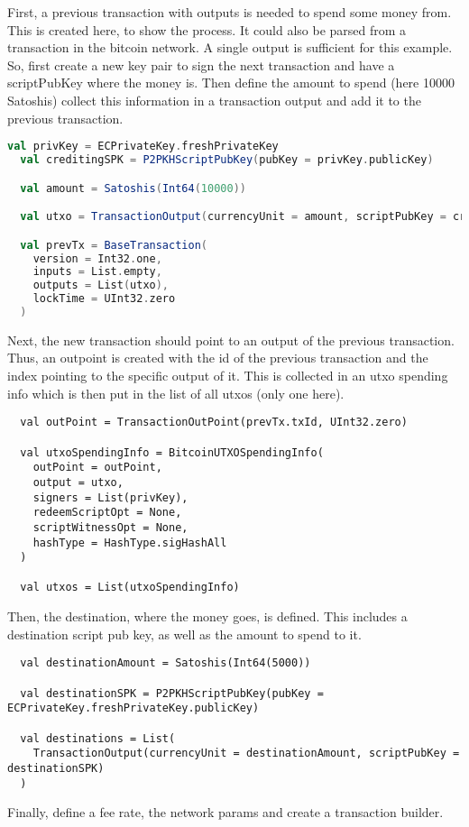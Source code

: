 First, a previous transaction with outputs is needed to spend some money from.
This is created here, to show the process.
It could also be parsed from a transaction in the bitcoin network.
A single output is sufficient for this example.
So, first create a new key pair to sign the next transaction and have a scriptPubKey where the money is.
Then define the amount to spend (here 10000 Satoshis) collect this information in a transaction output and add it to the previous transaction.
\begin{lstlisting}[language=scala]
  val privKey = ECPrivateKey.freshPrivateKey
  val creditingSPK = P2PKHScriptPubKey(pubKey = privKey.publicKey)

  val amount = Satoshis(Int64(10000))

  val utxo = TransactionOutput(currencyUnit = amount, scriptPubKey = creditingSPK)

  val prevTx = BaseTransaction(
    version = Int32.one,
    inputs = List.empty,
    outputs = List(utxo),
    lockTime = UInt32.zero
  )
\end{lstlisting}
Next, the new transaction should point to an output of the previous transaction.
Thus, an outpoint is created with the id of the previous transaction and the index pointing to the specific output of it.
This is collected in an utxo spending info which is then put in the list of all utxos (only one here).
\begin{lstlisting}  
  val outPoint = TransactionOutPoint(prevTx.txId, UInt32.zero)

  val utxoSpendingInfo = BitcoinUTXOSpendingInfo(
    outPoint = outPoint,
    output = utxo,
    signers = List(privKey),
    redeemScriptOpt = None,
    scriptWitnessOpt = None,
    hashType = HashType.sigHashAll
  )

  val utxos = List(utxoSpendingInfo)
\end{lstlisting}
Then, the destination, where the money goes, is defined.
This includes a destination script pub key, as well as the amount to spend to it.
\begin{lstlisting}
  val destinationAmount = Satoshis(Int64(5000))

  val destinationSPK = P2PKHScriptPubKey(pubKey = ECPrivateKey.freshPrivateKey.publicKey)

  val destinations = List(
    TransactionOutput(currencyUnit = destinationAmount, scriptPubKey = destinationSPK)
  )
\end{lstlisting}
Finally, define a fee rate, the network params and create a transaction builder.
